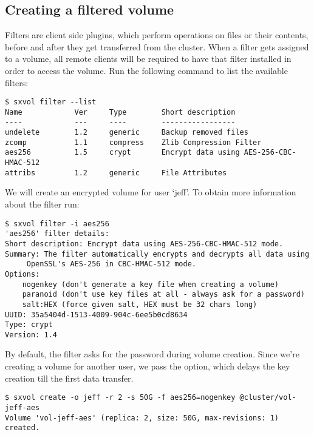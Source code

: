 \subsection{Creating a filtered volume}
Filters are client side plugins, which perform operations on files or their contents, before
and after they get transferred from the \SX cluster. When a filter gets assigned to a volume,
all remote clients will be required to have that filter installed in order to access the volume.
Run the following command to list the available filters:
\begin{lstlisting}
$ sxvol filter --list
Name            Ver     Type        Short description
----            ---     ----        -----------------
undelete        1.2     generic     Backup removed files
zcomp           1.1     compress    Zlib Compression Filter
aes256          1.5     crypt	    Encrypt data using AES-256-CBC-HMAC-512
attribs         1.2     generic     File Attributes
\end{lstlisting}
We will create an encrypted volume for user `jeff'. To obtain more information
about the  filter run:
\begin{lstlisting}
$ sxvol filter -i aes256
'aes256' filter details:
Short description: Encrypt data using AES-256-CBC-HMAC-512 mode.
Summary: The filter automatically encrypts and decrypts all data using
	 OpenSSL's AES-256 in CBC-HMAC-512 mode.
Options: 
	nogenkey (don't generate a key file when creating a volume)
	paranoid (don't use key files at all - always ask for a password)
	salt:HEX (force given salt, HEX must be 32 chars long)
UUID: 35a5404d-1513-4009-904c-6ee5b0cd8634
Type: crypt
Version: 1.4
\end{lstlisting}
By default, the  filter asks for the password during volume
creation. Since we're creating a volume for another user, we pass the
 option, which delays the key creation till the first data
transfer.
\begin{lstlisting}
$ sxvol create -o jeff -r 2 -s 50G -f aes256=nogenkey @cluster/vol-jeff-aes
Volume 'vol-jeff-aes' (replica: 2, size: 50G, max-revisions: 1) created.
\end{lstlisting}

